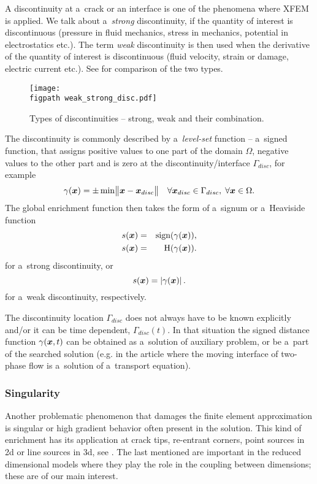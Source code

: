 A discontinuity at a~crack or an interface is one of the phenomena where XFEM is applied.
We talk about a~\emph{strong} discontinuity, if the quantity of interest is discontinuous (pressure in fluid mechanics, stress in mechanics, potential in electrostatics etc.).
The term \emph{weak} discontinuity is then used when the derivative of the quantity of interest is discontinuous (fluid velocity, strain or damage, electric current etc.). See  for comparison of the two types.
%
\begin{figure}[!htb]
  \centering    
    \texttt{[image: \\figpath weak\_strong\_disc.pdf]}
  \caption[Types of discontinuities.]{Types of discontinuities -- strong, weak and their combination. }
  \label{fig:types_of_discontinuities}
\end{figure}

The discontinuity is commonly described by a~\emph{level-set} function -- a~signed function,
that assigns positive values to one part of the domain $\Omega$, negative values to the other part and is zero at the discontinuity/interface $\Gamma_{disc}$, for example
\begin{equation}
    \gamma(\mathbf{\boldsymbol{x}}) = \pm \min \bigl\Vert\mathbf{\boldsymbol{x}}-\mathbf{\boldsymbol{x}}_{disc}\bigr\Vert \quad \forall \mathbf{\boldsymbol{x}}_{disc} \in \Gamma_{disc},\; \forall \mathbf{\boldsymbol{x}} \in \Omega.
\end{equation}
The global enrichment function then takes the form of a~signum or a~Heaviside function
\begin{eqnarray}
    s(\mathbf{\boldsymbol{x}}) &=& \textrm{sign}(\gamma(\mathbf{\boldsymbol{x}})),\\
    s(\mathbf{\boldsymbol{x}}) &=& \textrm{H}(\gamma(\mathbf{\boldsymbol{x}})).
\end{eqnarray}
for a~strong discontinuity, or
\begin{equation}
    s(\mathbf{\boldsymbol{x}}) = \left|\gamma(\mathbf{\boldsymbol{x}})\right|.
\end{equation}
for a~weak discontinuity, respectively.

The discontinuity location $\Gamma_{disc}$ does not always have to be known explicitly and/or it can be time dependent, $\Gamma_{disc}(t)$.
In that situation the signed distance function $\gamma(\mathbf{\boldsymbol{x}},t)$ can be obtained as a~solution of auxiliary problem, or be a~part of
the searched solution (e.g. in the article \cite{sauerland_stable_2013}
where the moving interface of two-phase flow is a~solution of a~transport equation).


\subsubsection{Singularity} \label{sec:glob_enr_singularity}
Another problematic phenomenon that damages the finite element approximation is singular or high gradient behavior often present in the solution.
This kind of enrichment has its application at crack tips, re-entrant corners, point sources in 2d or line sources in 3d, see .
The last mentioned are important in the reduced dimensional models where they play the role in the coupling between dimensions;
these are of our main interest.

